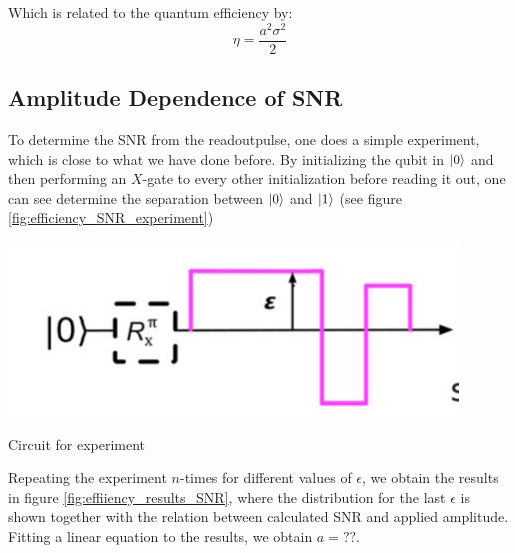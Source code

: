 Which is related to the quantum efficiency by\cite{boltink}:
\begin{equation}
    \eta = \frac{a^2\sigma^2}{2}
\end{equation}

\subsection{Amplitude Dependence of SNR}
To determine the SNR from the readoutpulse, one does a simple experiment, which is close to what we have done before.  By initializing the qubit in $\ket{0}$ and then performing an $X$-gate to every other initialization before reading it out, one can see determine the separation between $\ket{0}$ and $\ket{1}$ (see figure \ref{fig:efficiency_SNR_experiment})

\begin{marginfigure}
    \centering
    \includegraphics{Figs/calibrations/efficiency/experiment_circuit_SNR.png}
    \caption{Circuit for experiment}
    \label{fig:efficiency_SNR_experiment}
\end{marginfigure}

Repeating the experiment $n$-times for different values of $\epsilon$, we obtain the results in figure \ref{fig:effiiency_results_SNR}, where the distribution for the last $\epsilon$ is shown together with the relation between calculated SNR and applied amplitude. Fitting a linear equation to the results, we obtain $a = ??$.  

